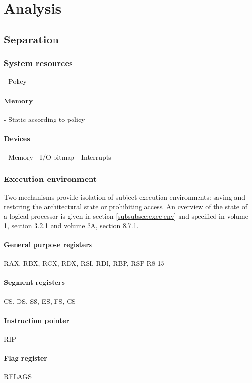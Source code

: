 \chapter{Analysis}

\section{Separation}

\subsection{System resources}
- Policy

\subsubsection{Memory}
- Static according to policy

\subsubsection{Devices}
- Memory
- I/O bitmap
- Interrupts

\subsection{Execution environment}
Two mechanisms provide isolation of subject execution environments: saving and
restoring the architectural state or prohibiting access. An overview of the
state of a logical processor is given in section \ref{subsubsec:exec-env} and
specified in \cite{IntelSDM} volume 1, section 3.2.1 and volume 3A,
section 8.7.1.

\subsubsection{General purpose registers}
RAX, RBX, RCX, RDX, RSI, RDI, RBP, RSP R8-15

\subsubsection{Segment registers}
CS, DS, SS, ES, FS, GS

\subsubsection{Instruction pointer}
RIP

\subsubsection{Flag register}
RFLAGS

